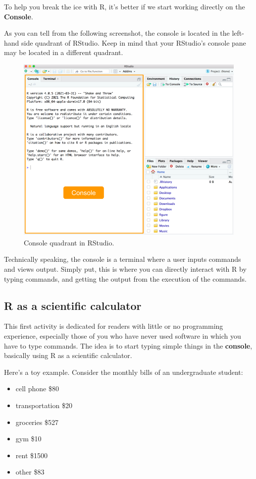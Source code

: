 \documentclass[
]{book}
\providecommand{\tightlist}{%
  \setlength{\itemsep}{0pt}\setlength{\parskip}{0pt}}
\begin{document}
To help you break the ice with R, it's better if we start working directly
on the \textbf{Console}.

As you can tell from the following screenshot, the console is located in the
left-hand side quadrant of RStudio. Keep in mind that your RStudio's console
pane may be located in a different quadrant.

\begin{figure}

{\centering \includegraphics[width=0.7\linewidth]{images/rstudio/rstudio-console-first-time} 

}

\caption{Console quadrant in RStudio.}\label{fig:unnamed-chunk-17}
\end{figure}

Technically speaking, the console is a terminal where a user inputs commands and
views output. Simply put, this is where you can directly interact with R by
typing commands, and getting the output from the execution of the commands.

\hypertarget{r-as-a-scientific-calculator}{%
\subsection{R as a scientific calculator}\label{r-as-a-scientific-calculator}}

This first activity is dedicated for readers with little or no programming
experience, especially those of you who have never used software in which you
have to type commands. The idea is to start typing simple things in the
\textbf{console}, basically using R as a scientific calculator.

Here's a toy example. Consider the monthly bills of an undergraduate student:

\begin{itemize}
\tightlist
\item
  cell phone \$80
\item
  transportation \$20
\item
  groceries \$527
\item
  gym \$10
\item
  rent \$1500
\item
  other \$83
\end{itemize}
\end{document}
